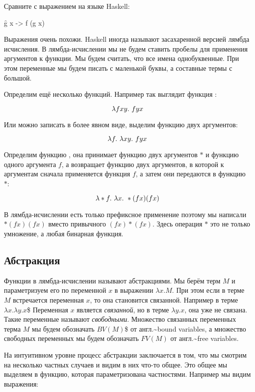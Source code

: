 Сравните с выражением на языке Haskell:


\begin{code}
\f g x -> f (g x)
\end{code}

Выражения очень похожи. Haskell иногда называют засахаренной версией
лямбда исчисления. В лямбда-исчислении мы не будем ставить пробелы для
применения аргументов к функции. Мы будем считать, что все имена
однобуквенные. При этом переменные мы будем писать с маленькой буквы, а
составные термы с большой.

Определим ещё несколько функций. Например так выглядит функция
:

\[\lambda fxy .\  fyx\]

Или можно записать в более явном виде, выделим функцию двух аргументов:

\[\lambda f .\  \lambda xy .\  fyx\]

Определим функцию , она принимает функцию двух аргументов $*$ и
функцию одного аргумента $f$, а возвращает функцию двух аргументов, в
которой к аргументам сначала применяется функция $f$, а затем они
передаются в функцию $*$:

\[\lambda * f .\  \lambda x .\  *(fx)(fx)\]

В лямбда-исчислении есть только префиксное применение поэтому мы
написали $*(fx)(fx)$ вместо привычного $(fx)*(fx)$. Здесь операция $*$
это не только умножение, а любая бинарная функция.

\subsection{Абстракция}

Функции в лямбда-исчислении называют абстракциями. Мы берём терм $M$ и
параметризуем его по переменной $x$ в выражении $\lambda x. M$. При этом
если в терме $M$ встречается переменная $x$, то она становится
связанной. Например в терме $\lambda x . \lambda y . x$\$ Переменная $x$
является \emph{связанной}, но в терме $\lambda y . x$, она уже не
связана. Такие переменные называют \emph{свободными}. Множество
связанных переменных терма $M$ мы будем обозначать $BV(M)$\$ от
англ.\textasciitilde{}bound variables, а множество свободных переменных
мы будем обозначать $FV(M)$ от англ.\textasciitilde{}free variables.

На интуитивном уровне процесс абстракции заключается в том, что мы
смотрим на несколько частных случаев и видим в них что-то общее. Это
общее мы выделяем в функцию, которая параметризована частностями.
Например мы видим выражения:

